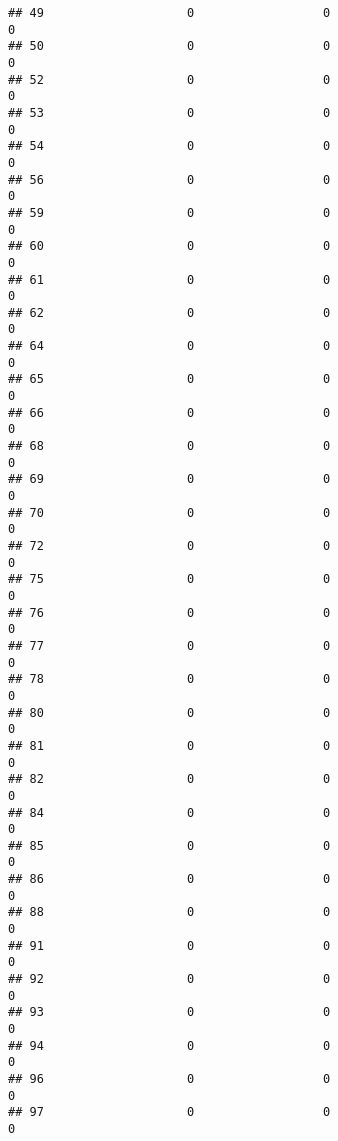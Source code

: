 \documentclass[
]{article}
\begin{document}
\begin{verbatim}
## 49                    0                  0                              0
## 50                    0                  0                              0
## 52                    0                  0                              0
## 53                    0                  0                              0
## 54                    0                  0                              0
## 56                    0                  0                              0
## 59                    0                  0                              0
## 60                    0                  0                              0
## 61                    0                  0                              0
## 62                    0                  0                              0
## 64                    0                  0                              0
## 65                    0                  0                              0
## 66                    0                  0                              0
## 68                    0                  0                              0
## 69                    0                  0                              0
## 70                    0                  0                              0
## 72                    0                  0                              0
## 75                    0                  0                              0
## 76                    0                  0                              0
## 77                    0                  0                              0
## 78                    0                  0                              0
## 80                    0                  0                              0
## 81                    0                  0                              0
## 82                    0                  0                              0
## 84                    0                  0                              0
## 85                    0                  0                              0
## 86                    0                  0                              0
## 88                    0                  0                              0
## 91                    0                  0                              0
## 92                    0                  0                              0
## 93                    0                  0                              0
## 94                    0                  0                              0
## 96                    0                  0                              0
## 97                    0                  0                              0

\end{verbatim}
\end{document}
